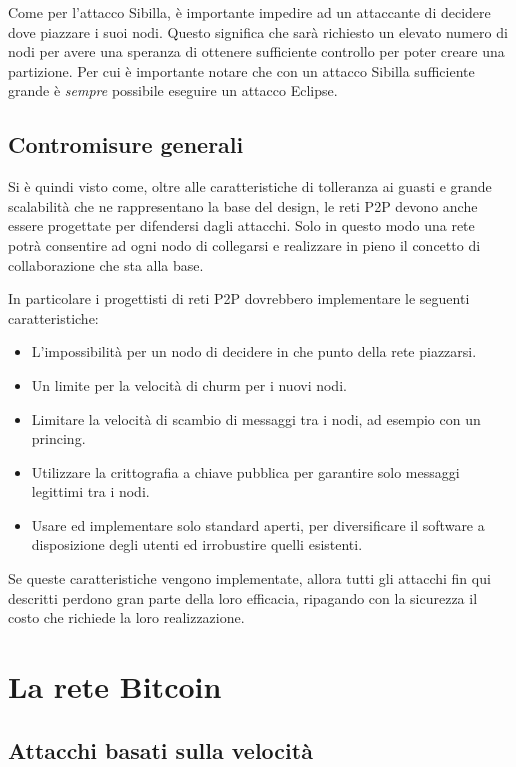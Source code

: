 Come per l'attacco Sibilla, è importante impedire ad un attaccante di decidere dove piazzare i suoi nodi. Questo significa che sarà richiesto un elevato numero di nodi per avere una speranza di ottenere sufficiente controllo per poter creare una partizione. Per cui è importante notare che con un attacco Sibilla sufficiente grande è \emph{sempre} possibile eseguire un attacco Eclipse.

\subsection{Contromisure generali}\label{contromisure-generali}

Si è quindi visto come, oltre alle caratteristiche di tolleranza ai guasti e grande scalabilità che ne rappresentano la base del design, le reti P2P devono anche essere progettate per difendersi dagli attacchi. Solo in questo modo una rete potrà consentire ad ogni nodo di collegarsi e realizzare in pieno il concetto di collaborazione che sta alla base.

In particolare i progettisti di reti P2P dovrebbero implementare le seguenti caratteristiche:

\begin{itemize}
\itemsep1pt\parskip0pt
\item
  L'impossibilità per un nodo di decidere in che punto della rete   piazzarsi.
\item
  Un limite per la velocità di churm per i nuovi nodi.
\item
  Limitare la velocità di scambio di messaggi tra i nodi, ad esempio   con un princing.
\item
  Utilizzare la crittografia a chiave pubblica per garantire solo   messaggi legittimi tra i nodi.
\item
  Usare ed implementare solo standard aperti, per diversificare il   software a disposizione degli utenti ed irrobustire quelli esistenti.
\end{itemize}

Se queste caratteristiche vengono implementate, allora tutti gli attacchi fin qui descritti perdono gran parte della loro efficacia, ripagando con la sicurezza il costo che richiede la loro realizzazione.

\section{La rete Bitcoin}\label{la-rete-bitcoin}

\subsection{Attacchi basati sulla velocità}\label{double-spending}

